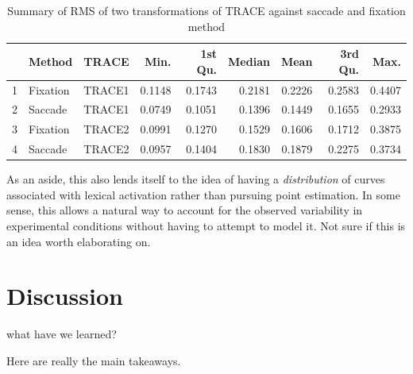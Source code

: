 \documentclass{article}
\begin{document}
\begin{table}[ht]
\centering
\begin{tabular}{rllrrrrrr}
  \hline
 & Method & TRACE & Min. & 1st Qu. & Median & Mean & 3rd Qu. & Max. \\ 
  \hline
1 & Fixation & TRACE1 & 0.1148 & 0.1743 & 0.2181 & 0.2226 & 0.2583 & 0.4407 \\ 
  2 & Saccade & TRACE1 & 0.0749 & 0.1051 & 0.1396 & 0.1449 & 0.1655 & 0.2933 \\ \hline
  3 & Fixation & TRACE2 & 0.0991 & 0.1270 & 0.1529 & 0.1606 & 0.1712 & 0.3875 \\ 
  4 & Saccade & TRACE2 & 0.0957 & 0.1404 & 0.1830 & 0.1879 & 0.2275 & 0.3734 \\ 
   \hline
\end{tabular}
\caption{Summary of RMS of two transformations of TRACE against saccade and fixation method}
\label{tab:mise_trace}
\end{table}

As an aside, this also lends itself to the idea of having a \textit{distribution} of curves associated with lexical activation rather than pursuing point estimation.  In some sense, this allows a natural way to account for the observed variability in experimental conditions without having to attempt to model it. Not sure if this is an idea worth elaborating on.



\section{Discussion}

what have we learned?

Here are really the main takeaways.
\end{document}
